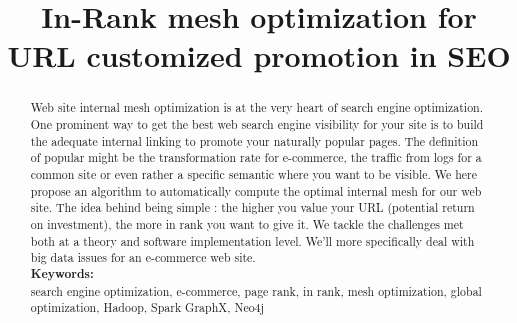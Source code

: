\documentclass{iSWAGArticle}
\title{In-Rank mesh optimization for URL customized promotion in SEO}
\author{\iSWAGAuthor{Stefan Duprey\\
Cdiscount\\
stefan.duprey@cdiscount.com} \and \iSWAGAuthor{Fabien Jaunas\\
Cdiscount\\
fabien.jaunas@cdiscount.com}}
\begin{document}
\maketitle
\begin{abstract}
 Web site internal mesh optimization is at the very heart of search engine optimization. 
 One prominent way to get the best web search engine visibility for your site 
 is to build the adequate internal linking to promote your naturally popular pages. 
 The definition of popular might be the transformation rate for e-commerce, 
 the traffic from logs for a common site or even rather a specific semantic where you want to be visible. 
 We here propose an algorithm to automatically compute the optimal internal mesh for our web site. The idea
 behind being simple : the higher you value your URL (potential return on investment), the more in rank you want to give it.
 We tackle the challenges met both at a theory and software implementation level. 
 We'll more specifically deal with big data issues for an e-commerce web site.
 \\\newline
 \indent \textbf{Keywords: }
 \\\newline
search engine optimization, e-commerce, page rank, in rank, mesh optimization, global optimization, Hadoop, Spark GraphX, Neo4j
\end{abstract}
\end{document}
